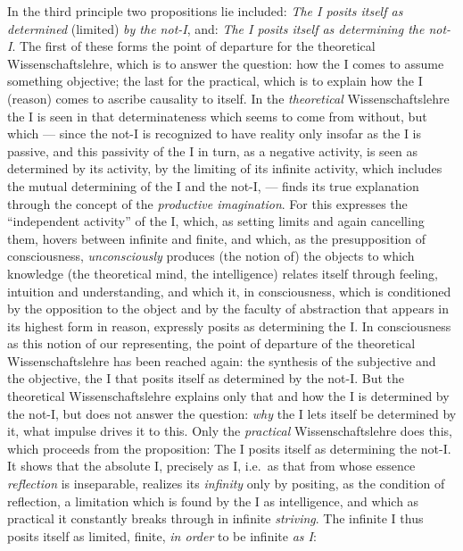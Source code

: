In the third principle two propositions lie included: \emph{The I
posits itself as determined} (limited) \emph{by the not-I}, and:
\emph{The I posits itself as determining the not-I}. The first of these
forms the point of departure for the theoretical Wissenschaftslehre,
which is to answer the question: how the I comes to assume something
objective; the last for the practical, which is to explain how the I
(reason) comes to ascribe causality to itself. In the
\emph{theoretical} Wissenschaftslehre the I is seen in that
determinateness which seems to come from without, but which --- since
the not-I is recognized to have reality only insofar as the I is
passive, and this passivity of the I in turn, as a negative activity, is
seen as determined by its activity, by the limiting of its infinite
activity, which includes the mutual determining of the I and the not-I,
--- finds its true explanation through the concept of the
\emph{productive imagination}. For this expresses the ``independent
activity'' of the I, which, as setting limits and again cancelling
them, hovers between infinite and finite, and which, as the
presupposition of consciousness, \emph{unconsciously} produces (the
notion of) the objects to which knowledge (the theoretical mind, the
intelligence) relates itself through feeling, intuition and
understanding, and which it, in consciousness, which is conditioned by
the opposition to the object and by the faculty of abstraction that
appears in its highest form in reason, expressly posits as determining
the I. In consciousness as this notion of our representing, the point
of departure of the theoretical Wissenschaftslehre has been reached
again: the synthesis of the subjective and the objective, the I that
posits itself as determined by the not-I. But the theoretical
Wissenschaftslehre explains
\setcounter{footnote}{0}only that and how the I is
determined by the not-I, but does not answer the question: \emph{why}
the I lets itself be determined by it, what impulse drives it to this.
Only the \emph{practical} Wissenschaftslehre does this, which proceeds
from the proposition: The I posits itself as determining the not-I. It
shows that the absolute I, precisely as I, i.e.\ as that from whose
essence \emph{reflection} is inseparable, realizes its \emph{infinity}
only by positing, as the condition of reflection, a limitation which is
found by the I as intelligence, and which as practical it constantly
breaks through in infinite \emph{striving}. The infinite I thus posits
itself as limited, finite, \emph{in order} to be infinite \emph{as I}:
